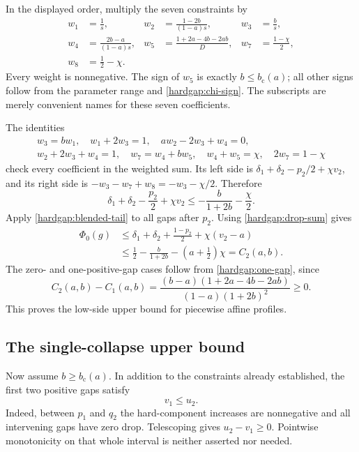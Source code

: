 In the displayed order, multiply the seven constraints by
\begin{equation}\label{hardgap:low-weights}
 \begin{aligned}
 w_1&=\frac1s,&
 w_2&=\frac{1-2b}{(1-a)s},&
 w_3&=\frac b{s},\\
 w_4&=\frac{2b-a}{(1-a)s},&
 w_5&=\frac{1+2a-4b-2ab}{D},&
 w_7&=\frac{1-\chi}{2},\\
 w_8&=\frac12-\chi.&&&&
 \end{aligned}
\end{equation}
Every weight is nonnegative. The sign of \(w_5\) is exactly
\(b\le b_{\mathrm c}(a)\); all other signs follow from the parameter
range and \eqref{hardgap:chi-sign}. The subscripts are merely convenient
names for these seven coefficients.

The identities
\[
 \begin{gathered}
 w_3=bw_1,\quad w_1+2w_3=1,\quad
 aw_2-2w_3+w_4=0,\\
 w_2+2w_3+w_4=1,\quad
 w_7=w_4+bw_5,\quad w_4+w_5=\chi,\quad
 2w_7=1-\chi
 \end{gathered}
\]
check every coefficient in the weighted sum. Its left side is
\(\delta_1+\delta_2-p_2/2+\chi v_2\), and its right side is
\(-w_3-w_7+w_8=-w_3-\chi/2\). Therefore
\begin{equation}\label{hardgap:low-certificate}
 \delta_1+\delta_2-\frac{p_2}{2}+\chi v_2
 \le-\frac b{1+2b}-\frac\chi2.
\end{equation}
Apply \eqref{hardgap:blended-tail} to all gaps after \(p_2\). Using
\eqref{hardgap:drop-sum} gives
\begin{align*}
 \Phi_0(g)
 &\le\delta_1+\delta_2+\frac{1-p_2}{2}+\chi(v_2-a)\\
 &\le\frac12-\frac b{1+2b}-\left(a+\frac12\right)\chi
 =C_2(a,b).
\end{align*}
The zero- and one-positive-gap cases follow from
\eqref{hardgap:one-gap}, since
\begin{equation}\label{hardgap:cost-difference}
 C_2(a,b)-C_1(a,b)
 =\frac{(b-a)(1+2a-4b-2ab)}{(1-a)(1+2b)^2}\ge0.
\end{equation}
This proves the low-side upper bound for piecewise affine profiles.

\subsection{The single-collapse upper bound}
\label{hardgap:high-proof}

Now assume \(b\ge b_{\mathrm c}(a)\). In addition to the constraints
already established, the first two positive gaps satisfy
\begin{equation}\label{hardgap:between-gaps}
 v_1\le u_2.
\end{equation}
Indeed, between \(p_1\) and \(q_2\) the hard-component increases
are nonnegative and all intervening gaps have zero drop. Telescoping gives
\(u_2-v_1\ge0\). Pointwise monotonicity on that whole interval is
neither asserted nor needed.

